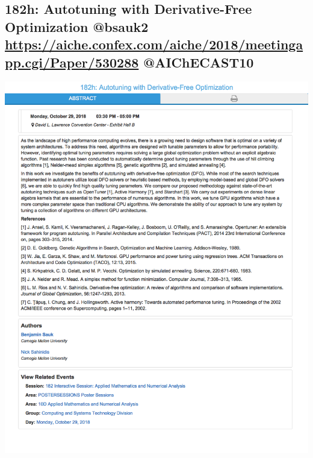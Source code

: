 \documentclass[11pt]{article}
\begin{document}
\subsection{182h: Autotuning with Derivative-Free Optimization @bsauk2 \url{https://aiche.confex.com/aiche/2018/meetingapp.cgi/Paper/530288} @AIChECAST10}
\label{sec:orgd5721ab}
\begin{center}
\includegraphics[width=.9\linewidth]{./530288.png}
\end{center}
\end{document}
